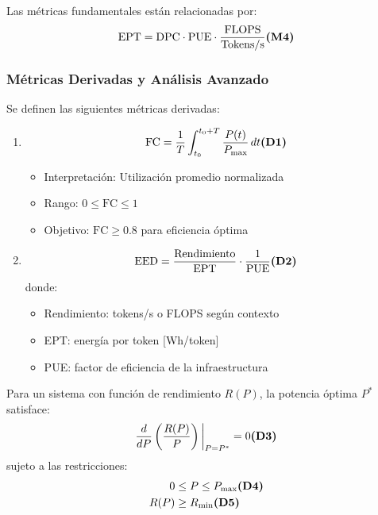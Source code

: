 \begin{teorema}
Las métricas fundamentales están relacionadas por:
\begin{equation}
    \text{EPT} = \text{DPC} \cdot \text{PUE} \cdot \frac{\text{FLOPS}}{\text{Tokens/s}} \textbf{(M4)}
\end{equation}
\end{teorema}

\subsubsection{Métricas Derivadas y Análisis Avanzado}

\begin{definicion}
Se definen las siguientes métricas derivadas:

\begin{enumerate}
    \item {}
    \begin{equation}
        \text{FC} = \frac{1}{T}\int_{t_0}^{t_0+T} \frac{P(t)}{P_{\text{max}}}\,dt \textbf{(D1)}
    \end{equation}
    \begin{itemize}
        \item Interpretación: Utilización promedio normalizada
        \item Rango: $0 \leq \text{FC} \leq 1$
        \item Objetivo: $\text{FC} \geq 0.8$ para eficiencia óptima
    \end{itemize}

    \item {}
    \begin{equation}
        \text{EED} = \frac{\text{Rendimiento}}{\text{EPT}} \cdot \frac{1}{\text{PUE}} \textbf{(D2)}
    \end{equation}
    donde:
    \begin{itemize}
        \item Rendimiento: tokens/s o FLOPS según contexto
        \item EPT: energía por token [Wh/token]
        \item PUE: factor de eficiencia de la infraestructura
    \end{itemize}
\end{enumerate}
\end{definicion}

\begin{teorema}
Para un sistema con función de rendimiento $R(P)$, la potencia óptima $P^*$ satisface:
\begin{equation}
    \frac{d}{dP}\left(\frac{R(P)}{P}\right)\bigg|_{P=P^*} = 0 \textbf{(D3)}
\end{equation}
sujeto a las restricciones:
\begin{align}
    0 &\leq P \leq P_{\text{max}} \textbf{(D4)} \\
    R(P) &\geq R_{\text{min}} \textbf{(D5)}
\end{align}
\end{teorema}

